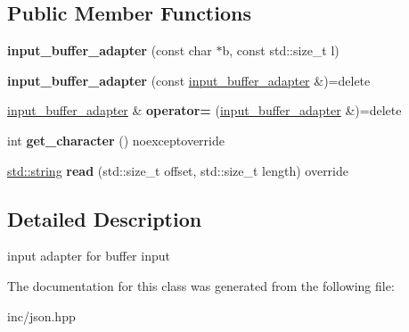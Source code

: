 \subsection*{Public Member Functions}
\begin{DoxyCompactItemize}
\item 
{\bfseries input\+\_\+buffer\+\_\+adapter} (const char $\ast$b, const std\+::size\+\_\+t l)\hypertarget{classnlohmann_1_1detail_1_1input__buffer__adapter_aee9d094d369bcd8f110eae4a175a8fa9}{}\label{classnlohmann_1_1detail_1_1input__buffer__adapter_aee9d094d369bcd8f110eae4a175a8fa9}

\item 
{\bfseries input\+\_\+buffer\+\_\+adapter} (const \hyperlink{classnlohmann_1_1detail_1_1input__buffer__adapter}{input\+\_\+buffer\+\_\+adapter} \&)=delete\hypertarget{classnlohmann_1_1detail_1_1input__buffer__adapter_ada76d7b75c5d6b989af0e18687ef07b6}{}\label{classnlohmann_1_1detail_1_1input__buffer__adapter_ada76d7b75c5d6b989af0e18687ef07b6}

\item 
\hyperlink{classnlohmann_1_1detail_1_1input__buffer__adapter}{input\+\_\+buffer\+\_\+adapter} \& {\bfseries operator=} (\hyperlink{classnlohmann_1_1detail_1_1input__buffer__adapter}{input\+\_\+buffer\+\_\+adapter} \&)=delete\hypertarget{classnlohmann_1_1detail_1_1input__buffer__adapter_a0871125057d993684ba8e45fb2b8a76b}{}\label{classnlohmann_1_1detail_1_1input__buffer__adapter_a0871125057d993684ba8e45fb2b8a76b}

\item 
int {\bfseries get\+\_\+character} () noexceptoverride\hypertarget{classnlohmann_1_1detail_1_1input__buffer__adapter_a3f03f910db299a9066923ddcccdb8a3c}{}\label{classnlohmann_1_1detail_1_1input__buffer__adapter_a3f03f910db299a9066923ddcccdb8a3c}

\item 
\hyperlink{namespacenlohmann_1_1detail_a90aa5ef615aa8305e9ea20d8a947980fab45cffe084dd3d20d928bee85e7b0f21}{std\+::string} {\bfseries read} (std\+::size\+\_\+t offset, std\+::size\+\_\+t length) override\hypertarget{classnlohmann_1_1detail_1_1input__buffer__adapter_af124e55c96814ae3a272dd5f0cb5351b}{}\label{classnlohmann_1_1detail_1_1input__buffer__adapter_af124e55c96814ae3a272dd5f0cb5351b}

\end{DoxyCompactItemize}


\subsection{Detailed Description}
input adapter for buffer input 

The documentation for this class was generated from the following file\+:\begin{DoxyCompactItemize}
\item 
inc/json.\+hpp\end{DoxyCompactItemize}

